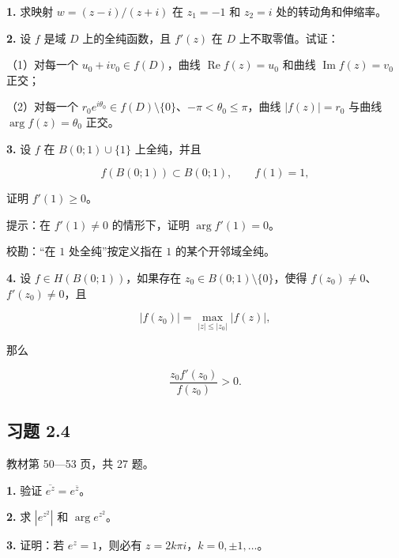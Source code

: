 \documentclass[11pt,a4paper]{article}
\begin{document}
\par{}
\noindent\textbf{1.} 求映射 \(w=(z-i)/(z+i)\) 在 \(z_1=-1\) 和 \(z_2=i\)
处的转动角和伸缩率。

\par{}
\noindent\textbf{2.} 设 \(f\) 是域 \(D\) 上的全纯函数，且 \(f'(z)\) 在 \(D\)
上不取零值。试证：

（1）对每一个 \(u_0+iv_0\in f(D)\)，曲线 \(\operatorname{Re}f(z)=u_0\)
和曲线 \(\operatorname{Im}f(z)=v_0\) 正交；

（2）对每一个
\(r_0e^{i\theta_0}\in f(D)\setminus\{0\}\)、\(-\pi<\theta_0\le\pi\)，曲线
\(|f(z)|=r_0\) 与曲线 \(\arg f(z)=\theta_0\) 正交。

\par{}
\noindent\textbf{3.} 设 \(f\) 在 \(B(0;1)\cup\{1\}\) 上全纯，并且

\[
f(B(0;1))\subset B(0;1),\qquad f(1)=1,
\]

证明 \(f'(1)\ge0\)。

提示：在 \(f'(1)\ne0\) 的情形下，证明 \(\arg f'(1)=0\)。

校勘：``在 \(1\) 处全纯''按定义指在 \(1\) 的某个开邻域全纯。

\par{}
\noindent\textbf{4.} 设 \(f\in H(B(0;1))\)，如果存在
\(z_0\in B(0;1)\setminus\{0\}\)，使得
\(f(z_0)\ne0\)、\(f'(z_0)\ne0\)，且

\[
|f(z_0)|=\max_{|z|\le|z_0|}|f(z)|,
\]

那么

\[
\frac{z_0f'(z_0)}{f(z_0)}>0.
\]

\subsection{习题 2.4}\label{ch02-practice-ux4e60ux9898-2.4}

教材第 50---53 页，共 27 题。

\par{}
\noindent\textbf{1.} 验证 \(\overline{e^z}=e^{\bar z}\)。

\par{}
\noindent\textbf{2.} 求 \(|e^{z^2}|\) 和 \(\arg e^{z^2}\)。

\par{}
\noindent\textbf{3.} 证明：若 \(e^z=1\)，则必有
\(z=2k\pi i\)，\(k=0,\pm1,\ldots\)。
\end{document}
